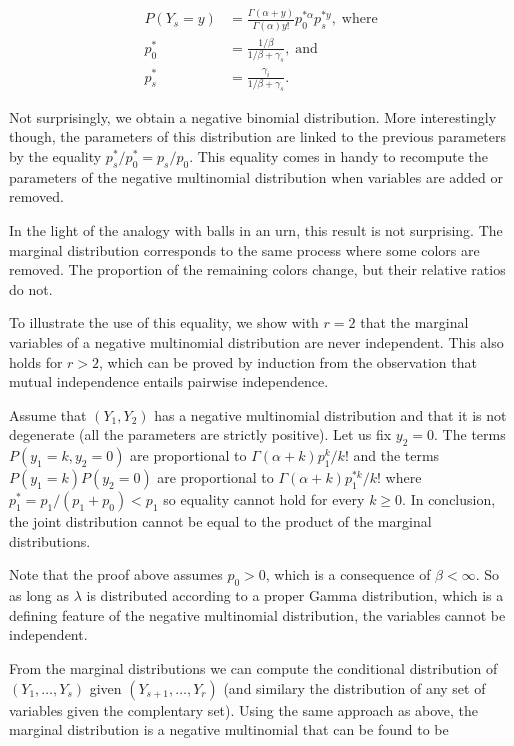 \documentclass[12pt]{article}
\begin{document}
\begin{appendices}
    \begin{align*}
    P(Y_s = y) &= \frac{\Gamma(\alpha+y)}{\Gamma(\alpha)y!}
      p_0^{*\alpha} p_s^{*y}, \; \text{where} \\
    p_0^* &= \frac{1/\beta}{1/\beta + \gamma_s}, \; \text{and} \\
    p_s^* &= \frac{\gamma_i}{1/\beta + \gamma_s}.
    \end{align*}

    Not surprisingly, we obtain a negative binomial distribution.
    More interestingly though, the parameters of this
    distribution are linked to the previous parameters
    by the equality $p_s^* / p_0^* = p_s / p_0$. This equality
    comes in handy to recompute the parameters of the negative
    multinomial distribution when variables are added or removed.

    In the light of the analogy with balls in an urn, this result
    is not surprising. The marginal distribution corresponds to
    the same process where some colors are removed. The proportion
    of the remaining colors change, but their relative ratios do
    not.

    To illustrate the use of this equality, we show with $r=2$ that
    the marginal variables of a negative multinomial distribution
    are never independent. This also holds for $r > 2$, which can be
    proved by induction from the observation that mutual independence
    entails pairwise independence.

    Assume that $(Y_1,Y_2)$ has a negative multinomial distribution
    and that it is not degenerate (all the parameters are strictly
    positive).  Let us fix $y_2 = 0$. The terms
    $P(y_1 = k, y_2 = 0)$ are proportional to
    $\Gamma(\alpha+k) p_1^k/k!$ and the terms $P(y_1 = k)P(y_2 = 0)$
    are proportional to $\Gamma(\alpha+k) p_1^{*k}/k!$ where
    $p_1^* = p_1 / (p_1 + p_0) < p_1$ so equality cannot hold
    for every $k \geq 0$. In conclusion, the joint distribution
    cannot be equal to the product of the marginal distributions.

    Note that the proof above assumes $p_0 > 0$, which is
    a consequence of $\beta < \infty$. So as long as $\lambda$ is
    distributed according to a proper Gamma distribution, which
    is a defining feature of the negative multinomial distribution, the
    variables cannot be independent.

    From the marginal distributions we can compute the conditional
    distribution of $(Y_1, \ldots, Y_s)$ given $(Y_{s+1}, \ldots, Y_r)$
    (and similary the distribution of any set of variables given
    the complentary set). Using the same approach as above, the
    marginal distribution is a negative multinomial that can be
    found to be


\end{appendices}
\end{document}
